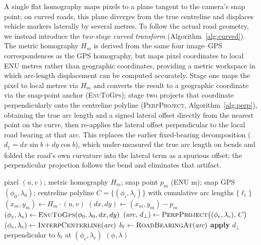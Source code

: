 \documentclass[conference]{IEEEtran}
\renewcommand{\_}{\textunderscore\allowbreak}
\begin{document}
A single flat homography maps pixels to a plane tangent to the camera's snap
point; on curved roads, this plane diverges from the true centreline and displaces
vehicle markers laterally by several metres. To follow the actual road geometry, we
instead introduce the \emph{two-stage curved transform}
(Algorithm~\ref{alg:curved}). The metric homography $H_m$ is derived from the same
four image--GPS correspondences as the GPS homography, but maps pixel coordinates
to local ENU metres rather than geographic coordinates, providing a metric workspace
in which arc-length displacement can be computed accurately. Stage one maps the
pixel to local metres via $H_m$ and converts the result to a geographic coordinate
via the snap-point anchor (\textsc{EnuToGps}); stage two projects that coordinate
perpendicularly onto the centreline polyline (\textsc{PerpProject},
Algorithm~\ref{alg:perp}), obtaining the true arc length and a signed lateral
offset directly from the nearest point on the curve, then re-applies the lateral
offset perpendicular to the local road bearing at that arc.
This replaces the earlier fixed-bearing decomposition
($d_\parallel = dx\sin b + dy\cos b$), which under-measured the true arc length on
bends and folded the road's own curvature into the lateral term as a spurious
offset; the perpendicular projection follows the bend and eliminates that artifact.

\begin{algorithm}
\caption{Two-stage curved pixel$\rightarrow$GPS transform (perpendicular-projection)}
\label{alg:curved}
\begin{algorithmic}[1]
\Require pixel $(u,v)$; metric homography $H_m$; snap point $p_m$ (ENU m);
         snap GPS $(\phi_0,\lambda_0)$; centreline polyline $C=\{(\phi_i,\lambda_i)\}$
         with cumulative arc lengths $\{\ell_i\}$
\State $(x_m,y_m) \gets H_m \cdot (u,v)$ 
\State $(dx,dy) \gets (x_m,y_m) - p_m$ 
\State $(\phi_e,\lambda_e) \gets \textsc{EnuToGps}(\phi_0,\lambda_0,dx,dy)$
\State $(\textit{arc},\, d_\perp) \gets \textsc{PerpProject}\big((\phi_e,\lambda_e),\, C\big)$
\State $(\phi_c,\lambda_c) \gets \textsc{InterpCenterline}(\textit{arc})$
\State $b_\ell \gets \textsc{RoadBearingAt}(\textit{arc})$
\State \textbf{apply} $d_\perp$ perpendicular to $b_\ell$ at $(\phi_c,\lambda_c)$
\State \Return $(\phi,\lambda)$
\end{algorithmic}
\end{algorithm}
\end{document}

